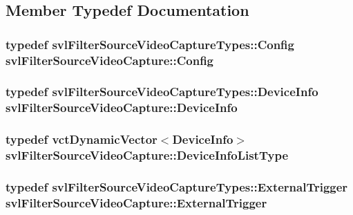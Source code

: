\subsection{Member Typedef Documentation}
\hypertarget{classsvl_filter_source_video_capture_ac541a625ce316b5320170cef3ca02277}{
\subsubsection[{Config}]{\setlength{\rightskip}{0pt plus 5cm}typedef {\bf svl\-Filter\-Source\-Video\-Capture\-Types\-::\-Config} {\bf svl\-Filter\-Source\-Video\-Capture\-::\-Config}}}\label{classsvl_filter_source_video_capture_ac541a625ce316b5320170cef3ca02277}
\hypertarget{classsvl_filter_source_video_capture_ad656487fb2deec890dc39764152b8f8b}{
\subsubsection[{Device\-Info}]{\setlength{\rightskip}{0pt plus 5cm}typedef {\bf svl\-Filter\-Source\-Video\-Capture\-Types\-::\-Device\-Info} {\bf svl\-Filter\-Source\-Video\-Capture\-::\-Device\-Info}}}\label{classsvl_filter_source_video_capture_ad656487fb2deec890dc39764152b8f8b}
\hypertarget{classsvl_filter_source_video_capture_a52d28d8296c6b85055022a72c69334e4}{
\subsubsection[{Device\-Info\-List\-Type}]{\setlength{\rightskip}{0pt plus 5cm}typedef {\bf vct\-Dynamic\-Vector}$<${\bf Device\-Info}$>$ {\bf svl\-Filter\-Source\-Video\-Capture\-::\-Device\-Info\-List\-Type}}}\label{classsvl_filter_source_video_capture_a52d28d8296c6b85055022a72c69334e4}
\hypertarget{classsvl_filter_source_video_capture_a609a8eb75ea23b7b35068207cc3c3144}{
\subsubsection[{External\-Trigger}]{\setlength{\rightskip}{0pt plus 5cm}typedef {\bf svl\-Filter\-Source\-Video\-Capture\-Types\-::\-External\-Trigger} {\bf svl\-Filter\-Source\-Video\-Capture\-::\-External\-Trigger}}}\label{classsvl_filter_source_video_capture_a609a8eb75ea23b7b35068207cc3c3144}
